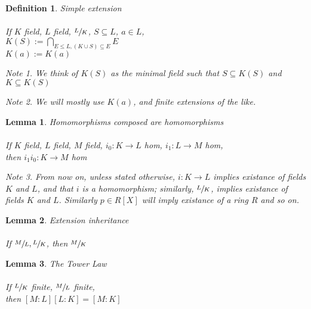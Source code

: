 \documentclass{article}
\theoremstyle{definitionstyle}
\newtheorem{defn}{Definition}[section]
\theoremstyle{lemmastyle}
\newtheorem{lem}{Lemma}[section]
\theoremstyle{remark}
\newtheorem*{note}{Note}
\begin{document}
\begin{defn} Simple extension\\
\\
If $K$ field, $L$ field, $\sfrac{L}{K}$, $S \subseteq L$, $a \in L$,\\

$K(S):= \displaystyle\bigcap\limits_{E \leq L, (K \cup S) \subseteq E}E$\\

$K(a):= K({a})$\\


\begin{note} We think of $K(S)$ as the minimal field such that $S \subseteq K(S)$ and $K \subseteq K(S)$ \end{note}
\begin{note} We will mostly use $K(a)$, and finite extensions of the like. \end{note}
\end{defn}

\begin{lem} Homomorphisms composed are homomorphisms\\
\\
If $K$ field, $L$ field, $M$ field, $i_0 : K \to L$ hom, $i_1 : L \to M$ hom,\\

then $i_1 i_0 : K \to M$ hom\\

\begin{note} From now on, unless stated otherwise, $i : K \to L$ implies existance of fields $K$ and $L$, and that $i$ is a homomorphism; similarly, $\sfrac{L}{K}$, implies existance of fields $K$ and $L$. Similarly $p \in R[X]$ will imply existance of a ring $R$ and so on.\end{note}
\end{lem}

\begin{lem} Extension inheritance\\
\\
If $\sfrac{M}{L}, \sfrac{L}{K}$, then $\sfrac{M}{K}$\\
\end{lem}

\begin{lem} The Tower Law\\
\\
If $\sfrac{L}{K}$ finite, $\sfrac{M}{L}$ finite,\\

then $[M:L] [L:K] = [M:K]$
\end{lem}
\end{document}
